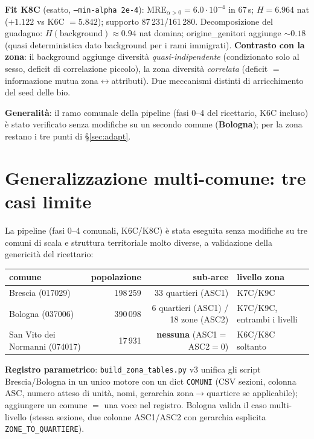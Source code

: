 \documentclass[11pt,a4paper]{article}
\newcommand{\code}[1]{\texttt{#1}}
\begin{document}
\medskip\noindent\textbf{Fit K8C} (esatto, \code{--min-alpha 2e-4}):
MRE$_{\alpha>0} = 6.0\cdot10^{-4}$ in 67\,s; $H = 6.964$ nat
($+1.122$ vs K6C $=5.842$); supporto 87\,231/161\,280.
Decomposizione del guadagno: $H(\text{background}) \approx 0.94$ nat domina;
origine\_genitori aggiunge $\sim0.18$ (quasi deterministica dato background
per i rami immigrati). \textbf{Contrasto con la zona}: il background aggiunge
diversit\`a \emph{quasi-indipendente} (condizionato solo al sesso, deficit di
correlazione piccolo), la zona diversit\`a \emph{correlata} (deficit $=$
informazione mutua zona$\leftrightarrow$attributi). Due meccanismi distinti
di arricchimento del seed delle bio.

\medskip\noindent\textbf{Generalit\`a}: il ramo comunale della pipeline
(fasi 0--4 del ricettario, K6C incluso) \`e stato verificato senza modifiche
su un secondo comune (\textbf{Bologna}); per la zona restano i tre punti di
\S\ref{sec:adapt}.

\section{Generalizzazione multi-comune: tre casi limite}
\label{sec:multicomune}
La pipeline (fasi 0--4 comunali, K6C/K8C) \`e stata eseguita senza
modifiche su tre comuni di scala e struttura territoriale molto diverse,
a validazione della genericit\`a del ricettario:

\begin{center}\small
\begin{tabular}{@{}lrrl@{}}
\toprule
\textbf{comune} & \textbf{popolazione} & \textbf{sub-aree} & \textbf{livello zona}\\
\midrule
Brescia (017029) & 198\,259 & 33 quartieri (ASC1) & K7C/K9C\\
Bologna (037006) & 390\,098 & 6 quartieri (ASC1) / 18 zone (ASC2) & K7C/K9C, entrambi i livelli\\
San Vito dei Normanni (074017) & 17\,931 & \textbf{nessuna} (ASC1$=$ASC2$=0$) & K6C/K8C soltanto\\
\bottomrule
\end{tabular}
\end{center}

\noindent\textbf{Registro parametrico}: \code{build\_zona\_tables.py} v3
unifica gli script Brescia/Bologna in un unico motore con un dict
\code{COMUNI} (CSV sezioni, colonna ASC, numero atteso di unit\`a, nomi,
gerarchia zona$\to$quartiere se applicabile); aggiungere un comune $=$
una voce nel registro. Bologna valida il caso multi-livello (stessa
sezione, due colonne ASC1/ASC2 con gerarchia esplicita
\code{ZONE\_TO\_QUARTIERE}).
\end{document}
